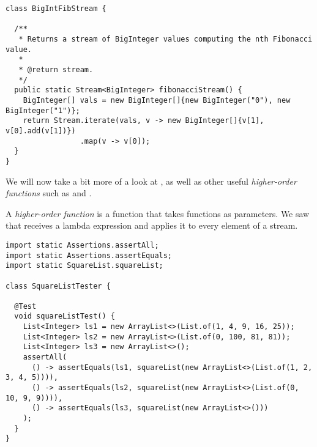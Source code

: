\begin{cl}[]{}
\begin{lstlisting}[language=MyJava]
class BigIntFibStream {

  /**
   * Returns a stream of BigInteger values computing the nth Fibonacci value.
   *
   * @return stream.
   */
  public static Stream<BigInteger> fibonacciStream() {
    BigInteger[] vals = new BigInteger[]{new BigInteger("0"), new BigInteger("1")};
    return Stream.iterate(vals, v -> new BigInteger[]{v[1], v[0].add(v[1])})
                 .map(v -> v[0]);
  }
}
\end{lstlisting}
\end{cl}

We will now take a bit more of a look at , as well as other useful \textit{higher-order functions} such as  and .

A \textit{higher-order function} is a function that takes functions as parameters. We saw that  receives a lambda expression and applies it to every element of a stream. 


\begin{cl}[]{}
\begin{lstlisting}[language=MyJava]
import static Assertions.assertAll;
import static Assertions.assertEquals;
import static SquareList.squareList;

class SquareListTester {

  @Test
  void squareListTest() {
    List<Integer> ls1 = new ArrayList<>(List.of(1, 4, 9, 16, 25));
    List<Integer> ls2 = new ArrayList<>(List.of(0, 100, 81, 81));
    List<Integer> ls3 = new ArrayList<>();
    assertAll(
      () -> assertEquals(ls1, squareList(new ArrayList<>(List.of(1, 2, 3, 4, 5)))),
      () -> assertEquals(ls2, squareList(new ArrayList<>(List.of(0, 10, 9, 9)))),
      () -> assertEquals(ls3, squareList(new ArrayList<>()))
    );
  }
}
\end{lstlisting}    
\end{cl}

